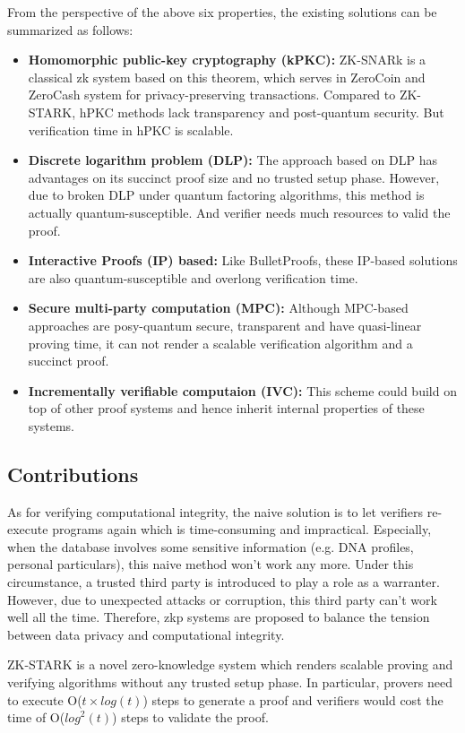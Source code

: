 \documentclass[conference]{IEEEtran}
\begin{document}
From the perspective of the above six properties, the existing solutions can be summarized as follows:

\begin{itemize}
    \item \textbf{Homomorphic public-key cryptography (kPKC):} ZK-SNARk is a classical zk system based on this theorem, which serves in ZeroCoin and ZeroCash system for privacy-preserving transactions.
    Compared to ZK-STARK, hPKC methods lack transparency and post-quantum security. But verification time in hPKC is scalable. 
    \item \textbf{Discrete logarithm problem (DLP):} The approach based on DLP has advantages on its succinct proof size and no trusted setup phase.
    However, due to broken DLP under quantum factoring algorithms, this method is actually quantum-susceptible. And verifier needs much resources to valid the proof.  
    \item \textbf{Interactive Proofs (IP) based:} Like BulletProofs, these IP-based solutions are also quantum-susceptible and overlong verification time.
    \item \textbf{Secure multi-party computation (MPC):} Although MPC-based approaches are posy-quantum secure, transparent and have quasi-linear proving time, it can not render a scalable verification algorithm and a succinct proof.
    \item \textbf{Incrementally verifiable computaion (IVC):} This scheme could build on top of other proof systems and hence inherit internal properties of these systems.
\end{itemize}

\subsection{Contributions}
As for verifying computational integrity, the naive solution is to let verifiers re-execute programs again which is time-consuming and impractical.
%
Especially, when the database involves some sensitive information (e.g. DNA profiles, personal particulars), this naive method won't work any more.
%
Under this circumstance, a trusted third party is introduced to play a role as a warranter.
%
However, due to unexpected attacks or corruption, this third party can't work well all the time.
%
Therefore, zkp systems are proposed to balance the tension between data privacy and computational integrity.

ZK-STARK is a novel zero-knowledge system which renders scalable proving and verifying algorithms without any trusted setup phase.
%
In particular, provers need to execute O($t{\times}log(t)$) steps to generate a proof and verifiers would cost the time of O(${log}^2(t)$) steps to validate the proof.
\end{document}
